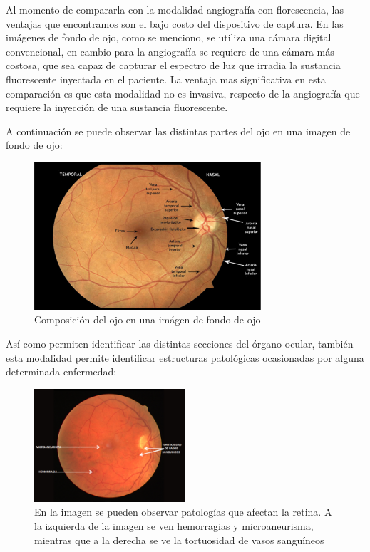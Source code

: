 Al momento de compararla con la modalidad angiograf\'ia con florescencia, las ventajas que encontramos son el bajo costo del dispositivo de captura. En las im\'agenes de fondo de ojo, como se menciono, se utiliza una c\'amara digital convencional, en cambio para la angiograf\'ia se requiere de una c\'amara m\'as costosa, que sea capaz de capturar el espectro de luz que irradia la sustancia fluorescente inyectada en el paciente. La ventaja mas significativa en esta comparaci\'on es que esta modalidad no es invasiva, respecto de la angiograf\'ia que requiere la inyecci\'on de una sustancia fluorescente.

A continuaci\'on se puede observar las distintas partes del ojo en una imagen de fondo de ojo:
\begin{figure}[H]
	{
	\centering
	\includegraphics[width=0.75\textwidth]{Figures/ComposicionOjoIFO}
	\caption[Glaucoma]{Composici\'on del ojo en una im\'agen de fondo de ojo}
	\label{fig:Composici\'on del ojo, observada en una im\'agen de fondo de ojo}
	}
\end{figure}

As\'i como permiten identificar las distintas secciones del \'organo ocular, tambi\'en esta modalidad permite identificar estructuras patol\'ogicas ocasionadas por alguna determinada enfermedad:
\begin{figure}[H]
	{
	\centering
	\includegraphics[width=0.5\textwidth]{Figures/HMT}
	\caption[HMT]{En la imagen se pueden observar patolog\'ias que afectan la retina. A la izquierda de la imagen se ven hemorragias y microaneurisma, mientras que a la derecha se ve la tortuosidad de vasos sangu\'ineos}
	\label{fig:Hemorragias,microaneurisma y tortuosidad de vasos sangu\'ineos}
	}
\end{figure}

